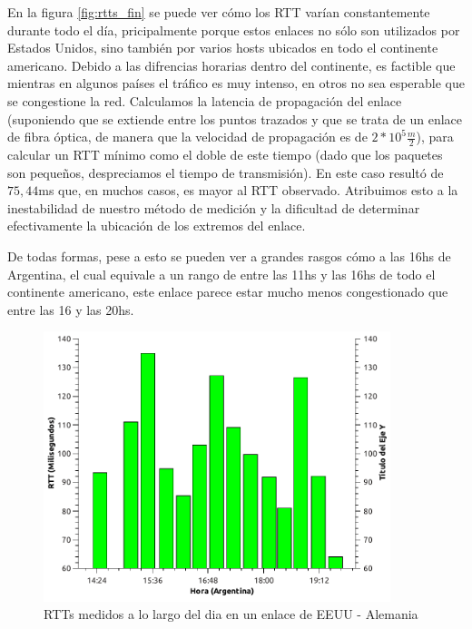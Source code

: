 
En la figura \ref{fig:rtts_fin} se puede ver cómo los RTT varían constantemente durante todo el día, pricipalmente porque estos enlaces no sólo son utilizados por Estados Unidos, sino también por varios hosts ubicados en todo el continente americano. Debido a las difrencias horarias dentro del continente, es factible que mientras en algunos países el tráfico es muy intenso, en otros no sea esperable que se congestione la red. Calculamos la latencia de propagación del enlace (suponiendo que se extiende entre los puntos trazados y que se trata de un enlace de fibra óptica, de manera que la velocidad de propagación es de $2*10^{5}\frac{m}{2}$), para calcular un RTT mínimo como el doble de este tiempo (dado que los paquetes son pequeños, despreciamos el tiempo de transmisión). En este caso resultó de $75,44$ms que, en muchos casos, es mayor al RTT observado. Atribuimos esto a la inestabilidad de nuestro método de medición y la dificultad de determinar efectivamente la ubicación de los extremos del enlace.

De todas formas, pese a esto se pueden ver a grandes rasgos cómo a las 16hs de Argentina, el cual equivale a un rango de entre las 11hs y las 16hs de todo el continente americano, este enlace parece estar mucho menos congestionado que entre las 16 y las 20hs. 



\begin{figure}[H]
  \centering
    \includegraphics[width=0.9\textwidth]{graficos/rtts_dia_inglaterra.pdf}
    \caption{RTTs medidos a lo largo del dia en un enlace de EEUU - Alemania}
    \label{fig:rtts_ing}
\end{figure}

